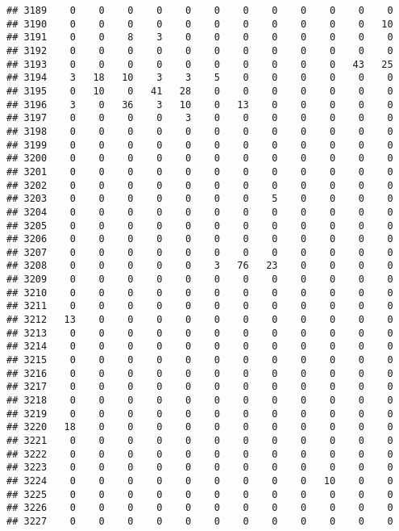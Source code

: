 \documentclass[]{article}
\begin{document}
\begin{verbatim}
## 3189    0    0    0    0    0    0    0    0    0    0    0    0
## 3190    0    0    0    0    0    0    0    0    0    0    0   10
## 3191    0    0    8    3    0    0    0    0    0    0    0    0
## 3192    0    0    0    0    0    0    0    0    0    0    0    0
## 3193    0    0    0    0    0    0    0    0    0    0   43   25
## 3194    3   18   10    3    3    5    0    0    0    0    0    0
## 3195    0   10    0   41   28    0    0    0    0    0    0    0
## 3196    3    0   36    3   10    0   13    0    0    0    0    0
## 3197    0    0    0    0    3    0    0    0    0    0    0    0
## 3198    0    0    0    0    0    0    0    0    0    0    0    0
## 3199    0    0    0    0    0    0    0    0    0    0    0    0
## 3200    0    0    0    0    0    0    0    0    0    0    0    0
## 3201    0    0    0    0    0    0    0    0    0    0    0    0
## 3202    0    0    0    0    0    0    0    0    0    0    0    0
## 3203    0    0    0    0    0    0    0    5    0    0    0    0
## 3204    0    0    0    0    0    0    0    0    0    0    0    0
## 3205    0    0    0    0    0    0    0    0    0    0    0    0
## 3206    0    0    0    0    0    0    0    0    0    0    0    0
## 3207    0    0    0    0    0    0    0    0    0    0    0    0
## 3208    0    0    0    0    0    3   76   23    0    0    0    0
## 3209    0    0    0    0    0    0    0    0    0    0    0    0
## 3210    0    0    0    0    0    0    0    0    0    0    0    0
## 3211    0    0    0    0    0    0    0    0    0    0    0    0
## 3212   13    0    0    0    0    0    0    0    0    0    0    0
## 3213    0    0    0    0    0    0    0    0    0    0    0    0
## 3214    0    0    0    0    0    0    0    0    0    0    0    0
## 3215    0    0    0    0    0    0    0    0    0    0    0    0
## 3216    0    0    0    0    0    0    0    0    0    0    0    0
## 3217    0    0    0    0    0    0    0    0    0    0    0    0
## 3218    0    0    0    0    0    0    0    0    0    0    0    0
## 3219    0    0    0    0    0    0    0    0    0    0    0    0
## 3220   18    0    0    0    0    0    0    0    0    0    0    0
## 3221    0    0    0    0    0    0    0    0    0    0    0    0
## 3222    0    0    0    0    0    0    0    0    0    0    0    0
## 3223    0    0    0    0    0    0    0    0    0    0    0    0
## 3224    0    0    0    0    0    0    0    0    0   10    0    0
## 3225    0    0    0    0    0    0    0    0    0    0    0    0
## 3226    0    0    0    0    0    0    0    0    0    0    0    0
## 3227    0    0    0    0    0    0    0    0    0    0    0    0

\end{verbatim}
\end{document}
